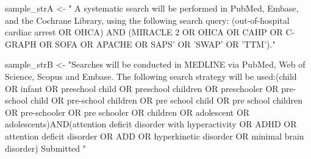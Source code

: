 \documentclass[
  letterpaper,
]{krantz}
\makeatletter
\newenvironment{Shaded}{\begin{snugshade}}{\end{snugshade}}
\newcommand{\NormalTok}[1]{\textcolor[rgb]{0.00,0.23,0.31}{#1}}
\newcommand{\OtherTok}[1]{\textcolor[rgb]{0.00,0.23,0.31}{#1}}
\newcommand{\StringTok}[1]{\textcolor[rgb]{0.13,0.47,0.30}{#1}}
\newenvironment{kframe}{%
\medskip{}
\setlength{\fboxsep}{.8em}
 \def\at@end@of@kframe{}%
 \ifinner\ifhmode%
  \def\at@end@of@kframe{\end{minipage}}%
  \begin{minipage}{\columnwidth}%
 \fi\fi%
 \def\FrameCommand##1{\hskip\@totalleftmargin \hskip-\fboxsep
 \colorbox{shadecolor}{##1}\hskip-\fboxsep
     \hskip-\linewidth \hskip-\@totalleftmargin \hskip\columnwidth}%
 \MakeFramed {\advance\hsize-\width
   \@totalleftmargin\z@ \linewidth\hsize
   \@setminipage}}%
 {\par\unskip\endMakeFramed%
 \at@end@of@kframe}
\renewenvironment{Shaded}{\begin{kframe}}{\end{kframe}}
\makeatother
\begin{document}
\begin{Shaded}
\begin{Highlighting}[]
\NormalTok{sample\_strA }\OtherTok{\textless{}{-}} \StringTok{" A systematic search will be performed in PubMed, }
\StringTok{Embase, and the Cochrane Library, using the following search query:   }
\StringTok{(\textquotesingle{}out{-}of{-}hospital cardiac arrest\textquotesingle{} OR \textquotesingle{}OHCA\textquotesingle{}) AND (\textquotesingle{}MIRACLE 2\textquotesingle{} OR }
\StringTok{\textquotesingle{}OHCA\textquotesingle{} OR \textquotesingle{}CAHP\textquotesingle{} OR \textquotesingle{}C{-}GRAPH\textquotesingle{} OR \textquotesingle{}SOFA\textquotesingle{} OR \textquotesingle{}APACHE\textquotesingle{} OR \textquotesingle{}SAPS’ OR }
\StringTok{’SWAP’ OR ’TTM’)."}

\NormalTok{sample\_strB }\OtherTok{\textless{}{-}} \StringTok{"Searches will be conducted in MEDLINE via PubMed, Web }
\StringTok{of Science, Scopus and Embase. The following search strategy will be }
\StringTok{used:(child OR infant OR preschool child OR preschool children OR }
\StringTok{preschooler OR pre{-}school child OR pre{-}school children OR pre school }
\StringTok{child OR pre school children OR pre{-}schooler OR pre schooler OR }
\StringTok{children OR adolescent OR adolescents)AND(attention deficit disorder }
\StringTok{with hyperactivity OR ADHD OR attention deficit disorder OR ADD OR }
\StringTok{hyperkinetic disorder OR minimal brain disorder) Submitted "}
\end{Highlighting}
\end{Shaded}
\end{document}
